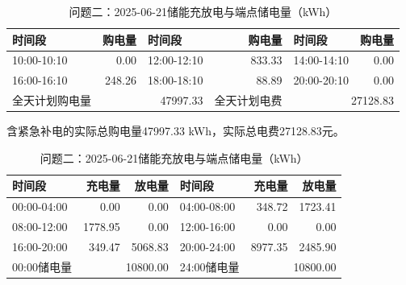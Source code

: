 \begin{table}[H]\centering\small\setlength{\tabcolsep}{5pt}
\caption{问题二：2025-06-21购电结果（电量：kWh；费用：元）}
\begin{tabular}{lrlrlr}\toprule
时间段 & 购电量 & 时间段 & 购电量 & 时间段 & 购电量 \\\midrule
10:00-10:10 & 0.00 & 12:00-12:10 & 833.33 & 14:00-14:10 & 0.00\\
16:00-16:10 & 248.26 & 18:00-18:10 & 88.89 & 20:00-20:10 & 0.00\\
\midrule 全天计划购电量 & \multicolumn{2}{r}{47997.33} & 全天计划电费 & \multicolumn{2}{r}{27128.83}\\\bottomrule
\end{tabular}
\par\vspace{2pt}\footnotesize
含紧急补电的实际总购电量47997.33 kWh，实际总电费27128.83元。
\vspace{3pt}\small
\caption{问题二：2025-06-21储能充放电与端点储电量（kWh）}
\begin{tabular}{lrrlrr}\toprule
时间段 & 充电量 & 放电量 & 时间段 & 充电量 & 放电量 \\\midrule
00:00-04:00 & 0.00 & 0.00 & 04:00-08:00 & 348.72 & 1723.41\\
08:00-12:00 & 1778.95 & 0.00 & 12:00-16:00 & 0.00 & 0.00\\
16:00-20:00 & 349.47 & 5068.83 & 20:00-24:00 & 8977.35 & 2485.90\\
\midrule 00:00储电量 & \multicolumn{2}{r}{10800.00} & 24:00储电量 & \multicolumn{2}{r}{10800.00}\\\bottomrule
\end{tabular}\end{table}
